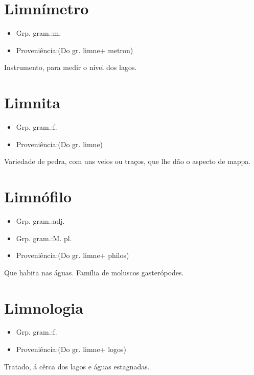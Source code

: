 \section{Limnímetro}
\begin{itemize}
\item {Grp. gram.:m.}
\end{itemize}
\begin{itemize}
\item {Proveniência:(Do gr. \textunderscore limne\textunderscore  + \textunderscore metron\textunderscore )}
\end{itemize}
Instrumento, para medir o nível dos lagos.
\section{Limnita}
\begin{itemize}
\item {Grp. gram.:f.}
\end{itemize}
\begin{itemize}
\item {Proveniência:(Do gr. \textunderscore limne\textunderscore )}
\end{itemize}
Variedade de pedra, com uns veios ou traços, que lhe dão o aspecto de mappa.
\section{Limnófilo}
\begin{itemize}
\item {Grp. gram.:adj.}
\end{itemize}
\begin{itemize}
\item {Grp. gram.:M. pl.}
\end{itemize}
\begin{itemize}
\item {Proveniência:(Do gr. \textunderscore limne\textunderscore  + \textunderscore philos\textunderscore )}
\end{itemize}
Que habita nas águas.
Família de moluscos gasterópodes.
\section{Limnologia}
\begin{itemize}
\item {Grp. gram.:f.}
\end{itemize}
\begin{itemize}
\item {Proveniência:(Do gr. \textunderscore limne\textunderscore  + \textunderscore logos\textunderscore )}
\end{itemize}
Tratado, á cêrca dos lagos e águas estagnadas.
